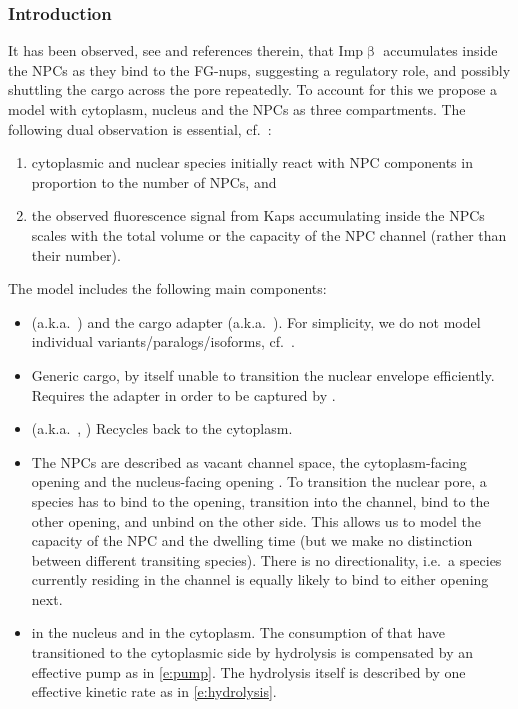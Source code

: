 \documentclass[12pt,notitlepage]{article}
\begin{document}
\subsubsection*{Introduction}

It has been observed,
see
\cite{KalitaKapinosLim2021} and references therein,
that Imp$\upbeta$ accumulates 
inside the NPCs
as they bind to the FG-nups,
suggesting a regulatory role,
and
possibly shuttling
the cargo across the pore
repeatedly.
%
%
To account for this
we propose
a model
with cytoplasm, nucleus
and
the NPCs 
as three compartments.
%
%
The following dual observation is essential, cf.~\cite[\S10]{Hofmeyr2020}:
%
\begin{enumerate}
\item 
	cytoplasmic and nuclear species initially react 
	with NPC components in proportion
	to the number of NPCs,
	and
\item
	the observed fluorescence signal
	from Kaps accumulating inside the NPCs
	scales with
	the total volume or the capacity of the NPC channel
	(rather than their number).
\end{enumerate}

%
%
%

The model includes the following main components:
%
\begin{itemize}
\item
	(a.k.a.~)
	and the cargo adapter
	(a.k.a.~).
	For simplicity,
	we do not model individual variants/paralogs/isoforms,
	cf.~\cite[p.~2]{KalitaKapinosLim2021}.
\item
	Generic  cargo,
	by itself unable to transition the nuclear envelope efficiently.
	Requires the  adapter
	in order to be captured by .
\item
	(a.k.a.~, )
	Recycles  back to the cytoplasm.
\item
	The NPCs are described
	as
	vacant  channel space,
	the cytoplasm-facing opening 
	and
	the nucleus-facing opening .
	To transition the nuclear pore,
	a species has to bind to the opening,
	transition into the channel,
	bind to the other opening,
	and unbind on the other side.
	This allows us to model the capacity of the NPC
	and the dwelling time
	(but we make no distinction between different transiting species).
	There is no directionality,
	i.e.~a species currently residing in the channel is equally
	likely to bind to either opening next.
\item
	 in the nucleus and  in the cytoplasm.
	The consumption of 
	that have transitioned to the cytoplasmic side
	by hydrolysis
	is compensated by an effective pump
	as in \eqref{e:pump}.
	The hydrolysis itself is described by one 
	effective kinetic rate as in \eqref{e:hydrolysis}.
\end{itemize}
\end{document}
